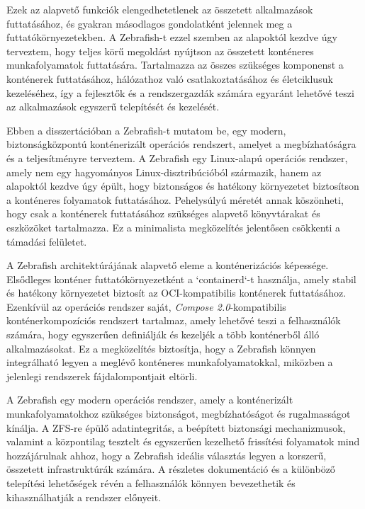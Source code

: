 Ezek az alapvető funkciók elengedhetetlenek az összetett alkalmazások futtatásához, és gyakran másodlagos gondolatként jelennek meg a futtatókörnyezetekben. A Zebrafish-t ezzel szemben az alapoktól kezdve úgy terveztem, hogy teljes körű megoldást nyújtson az összetett konténeres munkafolyamatok futtatására. Tartalmazza az összes szükséges komponenst a konténerek futtatásához, hálózathoz való csatlakoztatásához és életciklusuk kezeléséhez, így a fejlesztők és a rendszergazdák számára egyaránt lehetővé teszi az alkalmazások egyszerű telepítését és kezelését.

Ebben a disszertációban a Zebrafish-t mutatom be, egy modern, biztonságközpontú konténerizált operációs rendszert, amelyet a megbízhatóságra és a teljesítményre terveztem. A Zebrafish egy Linux-alapú operációs rendszer, amely nem egy hagyományos Linux-disztribúcióból származik, hanem az alapoktól kezdve úgy épült, hogy biztonságos és hatékony környezetet biztosítson a konténeres folyamatok futtatásához. Pehelysúlyú méretét annak köszönheti, hogy csak a konténerek futtatásához szükséges alapvető könyvtárakat és eszközöket tartalmazza. Ez a minimalista megközelítés jelentősen csökkenti a támadási felületet. 

A Zebrafish architektúrájának alapvető eleme a konténerizációs képessége. Elsődleges konténer futtatókörnyezetként a `containerd`-t használja, amely stabil és hatékony környezetet biztosít az OCI-kompatibilis konténerek futtatásához. Ezenkívül az operációs rendszer saját, \textit{Compose 2.0}-kompatibilis konténerkompozíciós rendszert tartalmaz, amely lehetővé teszi a felhasználók számára, hogy egyszerűen definiálják és kezeljék a több konténerből álló alkalmazásokat. Ez a megközelítés biztosítja, hogy a Zebrafish könnyen integrálható legyen a meglévő konténeres munkafolyamatokkal, miközben a jelenlegi rendszerek fájdalompontjait eltörli.

A Zebrafish egy modern operációs rendszer, amely a konténerizált munkafolyamatokhoz szükséges biztonságot, megbízhatóságot és rugalmasságot kínálja. A ZFS-re épülő adatintegritás, a beépített biztonsági mechanizmusok, valamint a központilag tesztelt és egyszerűen kezelhető frissítési folyamatok mind hozzájárulnak ahhoz, hogy a Zebrafish ideális választás legyen a korszerű, összetett infrastruktúrák számára. A részletes dokumentáció és a különböző telepítési lehetőségek révén a felhasználók könnyen bevezethetik és kihasználhatják a rendszer előnyeit.

